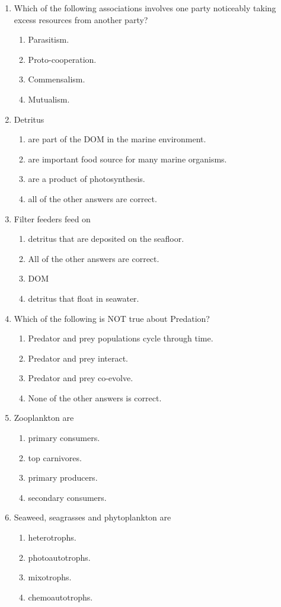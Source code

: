 \documentclass{report}
\begin{document}
\begin{enumerate}
    \item Which of the following associations involves one party noticeably taking excess resources from another party? 
    \begin{enumerate}
        \item   Parasitism. 
        \item   Proto-cooperation. 
        \item   Commensalism. 
        \item   Mutualism. 
    \end{enumerate}
    \item Detritus
    \begin{enumerate}
        \item   are part of the DOM in the marine environment. 
        \item   are important food source for many marine organisms. 
        \item   are a product of photosynthesis. 
        \item   all of the other answers are correct. 
    \end{enumerate}
    \item Filter feeders feed on
    \begin{enumerate}
        \item   detritus that are deposited on the seafloor. 
        \item   All of the other answers are correct. 
        \item   DOM
        \item   detritus that float in seawater. 
    \end{enumerate}
    \item Which of the following is NOT true about Predation?
    \begin{enumerate}
        \item   Predator and prey populations cycle through time. 
        \item   Predator and prey interact. 
        \item   Predator and prey co-evolve. 
        \item   None of the other answers is correct. 
    \end{enumerate}
    \item Zooplankton are
    \begin{enumerate}
        \item   primary consumers. 
        \item   top carnivores. 
        \item   primary producers. 
        \item   secondary consumers. 
    \end{enumerate}
    \item Seaweed, seagrasses and phytoplankton are
    \begin{enumerate}
        \item   heterotrophs. 
        \item   photoautotrophs. 
        \item   mixotrophs. 
        \item   chemoautotrophs. 
    \end{enumerate}
\end{enumerate}
\end{document}
